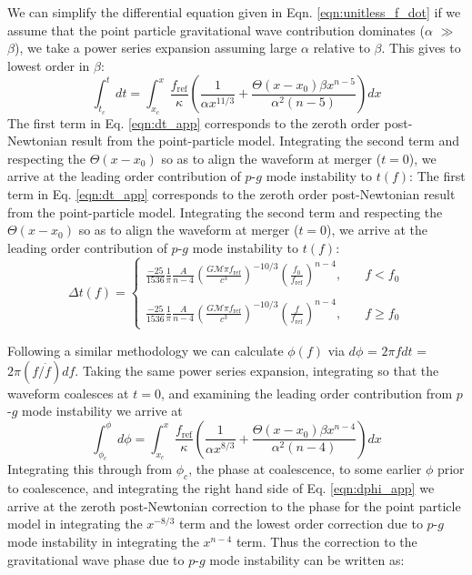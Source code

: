 We can simplify the differential equation given in Eqn. \ref{eqn:unitless_f_dot} if we assume that the point particle gravitational wave contribution dominates ($\alpha$ $\gg$ $\beta$), we take a power series expansion assuming large $\alpha$ relative to $\beta$. This gives to lowest order in $\beta$:
\begin{equation}\label{eqn:dt_app}
\int_{t_c}^t dt = \int_{x_c}^{x} \frac{f_{\mathrm{ref}}}{\kappa} \left (\frac{1}{\alpha x^{11/3}} +  \frac{\Theta(x - x_0) \beta x^{n-5}}{\alpha^2 (n-5)} \right ) dx
\end{equation}
The first term in Eq. \ref{eqn:dt_app} corresponds to the zeroth order post-Newtonian result from the point-particle model. Integrating the second term and respecting the $\Theta(x-x_0)$ so as to align the waveform at merger ($t=0$), we arrive at the leading order contribution of $p$-$g$ mode instability to $t(f)$:
The first term in Eq. \ref{eqn:dt_app} corresponds to the zeroth order post-Newtonian result from the point-particle model. Integrating the second term and respecting the $\Theta(x-x_0)$ so as to align the waveform at merger ($t=0$), we arrive at the leading order contribution of $p$-$g$ mode instability to $t(f)$:
\begin{equation}\label{eqn:t_of_f_app}
\Delta t(f) = \left \{
              \begin{array}{ll}
              \frac{-25}{1536} \frac{1}{\pi} \frac{A}{n-4} \left ( \frac{G \mathcal{M} \pi f_{\mathrm{ref}}}{c^3} \right )^{-10/3}\left ( \frac{f_0}{f_{\mathrm{ref}}} \right )^{n-4}, &\quad   f < f_0 \\ \\
              \frac{-25}{1536} \frac{1}{\pi} \frac{A}{n-4} \left ( \frac{G \mathcal{M} \pi f_{\mathrm{ref}}}{c^3} \right )^{-10/3}\left ( \frac{f}{f_{\mathrm{ref}}} \right )^{n-4}, &\quad  f \ge f_0
              \end{array}
              \right.
\end{equation}

Following a similar methodology we can calculate $\phi(f)$ via $d\phi$ = $2 \pi f dt$ = $2 \pi (f/\dot{f}) df$. Taking the same power series expansion, integrating so that the waveform coalesces at $t = 0$, and examining the leading order contribution from $p$-$g$ mode instability we arrive at
\begin{equation}\label{eqn:dphi_app}
\int_{\phi_c}^\phi d\phi = \int_{x_c}^{x} \frac{f_{\mathrm{ref}}}{\kappa} \left (\frac{1}{\alpha x^{8/3}} +  \frac{\Theta(x - x_0) \beta x^{n-4}}{\alpha^2 (n-4)} \right ) dx
\end{equation}
Integrating this through from $\phi_c$, the phase at coalescence, to some earlier $\phi$ prior to coalescence, and integrating the right hand side of Eq. \ref{eqn:dphi_app} we arrive at the zeroth post-Newtonian correction to the phase for the point particle model in integrating the $x^{-8/3}$ term and the lowest order correction due to $p$-$g$ mode instability in integrating the $x^{n-4}$ term. Thus the correction to the gravitational wave phase due to $p$-$g$ mode instability can be written as:

